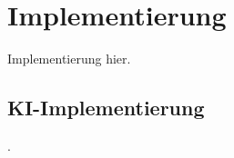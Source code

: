 
\section{Implementierung}
\label{sec:ki:implementierung}

Implementierung hier.

\subsection{KI-Implementierung}
\label{sec:ki_implementierung}

.
